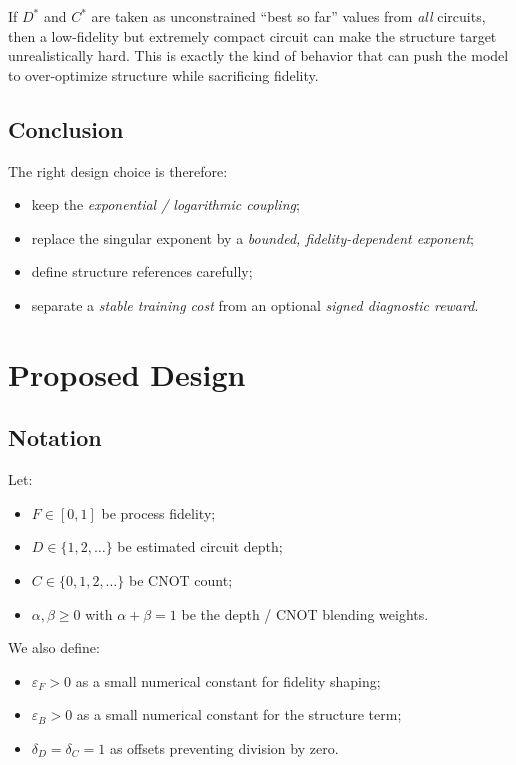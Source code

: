 \documentclass[11pt]{article}
\begin{document}
If $D^*$ and $C^*$ are taken as unconstrained ``best so far'' values from \emph{all} circuits,
then a low-fidelity but extremely compact circuit can make the structure target unrealistically hard.
This is exactly the kind of behavior that can push the model to over-optimize structure while sacrificing fidelity.

\subsection{Conclusion}

The right design choice is therefore:

\begin{itemize}[leftmargin=*]
\item keep the \emph{exponential / logarithmic coupling};
\item replace the singular exponent by a \emph{bounded, fidelity-dependent exponent};
\item define structure references carefully;
\item separate a \emph{stable training cost} from an optional \emph{signed diagnostic reward}.
\end{itemize}

\section{Proposed Design}

\subsection{Notation}

Let:

\begin{itemize}[leftmargin=*]
\item $F \in [0,1]$ be process fidelity;
\item $D \in \{1,2,\dots\}$ be estimated circuit depth;
\item $C \in \{0,1,2,\dots\}$ be CNOT count;
\item $\alpha,\beta \ge 0$ with $\alpha+\beta=1$ be the depth / CNOT blending weights.
\end{itemize}

We also define:

\begin{itemize}[leftmargin=*]
\item $\varepsilon_F > 0$ as a small numerical constant for fidelity shaping;
\item $\varepsilon_B > 0$ as a small numerical constant for the structure term;
\item $\delta_D = \delta_C = 1$ as offsets preventing division by zero.
\end{itemize}
\end{document}
